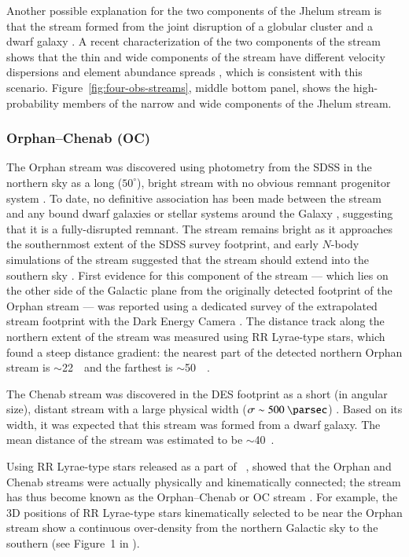 \documentclass[final,5p,times,twocolumn,authoryear]{elsarticle}
\begin{document}
Another possible explanation for the two components of the Jhelum stream is that the
stream formed from the joint disruption of a globular cluster and a dwarf galaxy
\citep{bonaca:2019}.
A recent characterization of the two components of the stream shows that the thin and
wide components of the stream have different velocity dispersions and element abundance
spreads \citep{awad:2024}, which is consistent with this scenario.
Figure~\ref{fig:four-obs-streams}, middle bottom panel, shows the high-probability
members of the narrow and wide components of the Jhelum stream.


\subsubsection{Orphan--Chenab (OC)}
\label{sec:oc}

The Orphan stream was discovered using photometry from the SDSS in the northern sky as a
long ($50^\circ$), bright stream with no obvious remnant progenitor system
\citep{belokurov:2006, grillmair:2006-orphan, belokurov:2007}.
To date, no definitive association has been made between the stream and any bound
dwarf galaxies or stellar systems around the Galaxy \citep{fellhauer:2007, newberg:2010,
casey:2013, casey:2014, grillmair:2015}, suggesting that it is a fully-disrupted
remnant.
The stream remains bright as it approaches the southernmost extent of the SDSS survey
footprint, and early $N$-body simulations of the stream suggested that the stream should
extend into the southern sky \citep[e.g.,][]{sales:2008}.
First evidence for this component of the stream --- which lies on the other side of the
Galactic plane from the originally detected footprint of the Orphan stream --- was
reported using a dedicated survey of the extrapolated stream footprint with the Dark
Energy Camera \citep{grillmair:2015}.
The distance track along the northern extent of the stream was measured using RR
Lyrae-type stars, which found a steep distance gradient: the nearest part of the
detected northern Orphan stream is $\sim$22~\kpc\ and the farthest is $\sim$50~\kpc\
\citep{sesar:2013, hendel:2018}.

The Chenab stream was discovered in the DES footprint as a short (in angular size),
distant stream with a large physical width ($\sigma \sim 500~\unit{\parsec}$)
\citep{shipp:2018}. Based on its width, it was expected that this stream was formed from
a dwarf galaxy. The mean distance of the stream was estimated to be $\sim$40~\kpc.

Using RR Lyrae-type stars released as a part of \gaia\ , \citet{koposov:2019}
showed that the Orphan and Chenab streams were actually physically and kinematically
connected; the stream has thus become known as the Orphan--Chenab or OC stream
\citep[see also][]{fardal:2019}.
For example, the 3D positions of RR Lyrae-type stars kinematically selected to be near
the Orphan stream show a continuous over-density from the northern Galactic sky to the
southern (see Figure~1 in \citealt{koposov:2019}).
\end{document}
